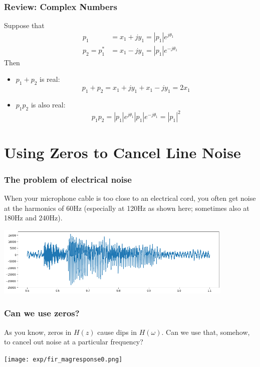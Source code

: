 \documentclass{beamer}
\begin{document}
\begin{frame}
  \frametitle{Review: Complex Numbers}

  Suppose that
  \begin{align*}
    p_1 &= x_1+jy_1 = |p_1|e^{j\theta_1}\\
    p_2=p_1^* &= x_1-jy_1 = |p_1|e^{-j\theta_1}
  \end{align*}
  Then
  \begin{itemize}
  \item $p_1+p_2$ is real:
    \begin{displaymath}
      p_1+p_2 = x_1+jy_1 + x_1-jy_1 = 2x_1
    \end{displaymath}
  \item $p_1p_2$ is also real:
    \begin{displaymath}
      p_1p_2 = |p_1|e^{j\theta_1} |p_1|e^{-j\theta_1} = |p_1|^2
    \end{displaymath}
  \end{itemize}
\end{frame}

\section[Line Noise]{Using Zeros to Cancel Line Noise}
\setcounter{subsection}{1}

\begin{frame}
  \frametitle{The problem of electrical noise}

  When your microphone cable is too close to an electrical cord, you
  often get noise at the harmonics of 60Hz (especially at 120Hz as
  shown here; sometimes also at 180Hz and 240Hz).
  \centerline{\includegraphics[width=4.5in]{waveform_with_120hz.png}}
\end{frame}

\begin{frame}
  \frametitle{Can we use zeros?}

  As you know, zeros in $H(z)$ cause dips in $H(\omega)$.  Can we use that, somehow,
  to cancel out noise at a particular frequency?
  \centerline{\texttt{[image: exp/fir\_magresponse0.png]}}
\end{frame}
\end{document}
